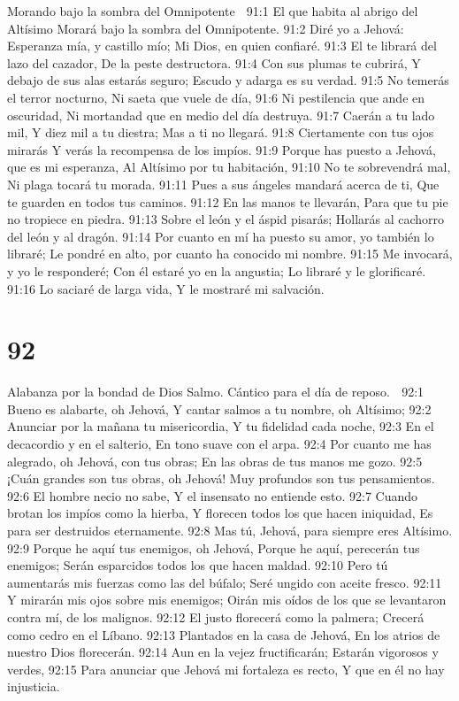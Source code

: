 Morando bajo la sombra del Omnipotente 

91:1 El que habita al abrigo del Altísimo 
Morará bajo la sombra del Omnipotente. 
91:2 Diré yo a Jehová: Esperanza mía, y castillo mío; 
Mi Dios, en quien confiaré. 
91:3 El te librará del lazo del cazador, 
De la peste destructora. 
91:4 Con sus plumas te cubrirá, 
Y debajo de sus alas estarás seguro; 
Escudo y adarga es su verdad. 
91:5 No temerás el terror nocturno, 
Ni saeta que vuele de día, 
91:6 Ni pestilencia que ande en oscuridad, 
Ni mortandad que en medio del día destruya. 
91:7 Caerán a tu lado mil, 
Y diez mil a tu diestra; 
Mas a ti no llegará. 
91:8 Ciertamente con tus ojos mirarás 
Y verás la recompensa de los impíos. 
91:9 Porque has puesto a Jehová, que es mi esperanza, 
Al Altísimo por tu habitación, 
91:10 No te sobrevendrá mal, 
Ni plaga tocará tu morada. 
91:11 Pues a sus ángeles mandará acerca de ti, 
Que te guarden en todos tus caminos. 
91:12 En las manos te llevarán, 
Para que tu pie no tropiece en piedra. 
91:13 Sobre el león y el áspid pisarás; 
Hollarás al cachorro del león y al dragón. 
91:14 Por cuanto en mí ha puesto su amor, yo también lo libraré; 
Le pondré en alto, por cuanto ha conocido mi nombre. 
91:15 Me invocará, y yo le responderé; 
Con él estaré yo en la angustia; 
Lo libraré y le glorificaré. 
91:16 Lo saciaré de larga vida, 
Y le mostraré mi salvación. 

\chapter{92}

Alabanza por la bondad de Dios 
Salmo. Cántico para el día de reposo. 

92:1 Bueno es alabarte, oh Jehová, 
Y cantar salmos a tu nombre, oh Altísimo; 
92:2 Anunciar por la mañana tu misericordia, 
Y tu fidelidad cada noche, 
92:3 En el decacordio y en el salterio, 
En tono suave con el arpa. 
92:4 Por cuanto me has alegrado, oh Jehová, con tus obras; 
En las obras de tus manos me gozo. 
92:5 ¡Cuán grandes son tus obras, oh Jehová! 
Muy profundos son tus pensamientos. 
92:6 El hombre necio no sabe, 
Y el insensato no entiende esto. 
92:7 Cuando brotan los impíos como la hierba, 
Y florecen todos los que hacen iniquidad, 
Es para ser destruidos eternamente. 
92:8 Mas tú, Jehová, para siempre eres Altísimo. 
92:9 Porque he aquí tus enemigos, oh Jehová, 
Porque he aquí, perecerán tus enemigos; 
Serán esparcidos todos los que hacen maldad. 
92:10 Pero tú aumentarás mis fuerzas como las del búfalo; 
Seré ungido con aceite fresco. 
92:11 Y mirarán mis ojos sobre mis enemigos; 
Oirán mis oídos de los que se levantaron contra mí, de los malignos. 
92:12 El justo florecerá como la palmera; 
Crecerá como cedro en el Líbano. 
92:13 Plantados en la casa de Jehová, 
En los atrios de nuestro Dios florecerán. 
92:14 Aun en la vejez fructificarán; 
Estarán vigorosos y verdes, 
92:15 Para anunciar que Jehová mi fortaleza es recto, 
Y que en él no hay injusticia. 

